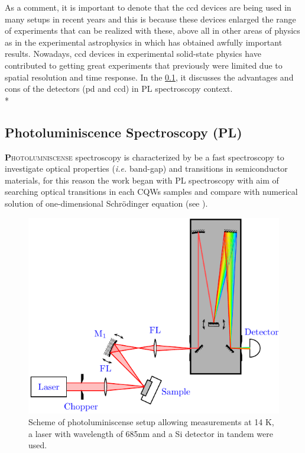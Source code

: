 As a comment, it is important to denote that the \gls{ccd} devices are being used in many setups in recent years and this is because these devices enlarged the range of experiments that can be realized with these, above all in other areas of physics as in the experimental astrophysics in which has obtained awfully important results.  Nowadays, \gls{ccd} devices in experimental solid-state physics have contributed to getting great experiments that previously were limited due to spatial resolution and time response.  In the \cref{subsec:chapter-3-pl}, it discusses the advantages and cons of the detectors (\gls{pd} and \gls{ccd})  in PL spectroscopy context. \\*

\subsection{Photoluminiscence Spectroscopy (PL)}
\label{subsec:chapter-3-pl}
\vspace{-10mm}
\lettrine[lines=3, lraise=.1, nindent=0mm, slope=0mm]{\textbf{P}}{hotolumniscense} spectroscopy is characterized by be a fast spectroscopy to investigate optical properties (\textit{i.e.} band-gap) and transitions in  semiconductor materials, for this reason the work began with PL spectroscopy with aim of searching optical transitions in each CQWs samples and compare with  numerical solution of one-dimensional Schr\"{o}dinger equation (see ). 
\begin{figure}[hbtp!]
	\centering
	\includegraphics[width=\textwidth]{../figures/chapter-3/pl-setup/build-ruco/pl-setup}
	\caption[PL Scheme]{Scheme of photoluminiscense setup allowing measurements at 14 K, a laser with wavelength of 685nm and a Si detector in tandem were used.}
	\label{fig:chapter-3 subsec 3.2.1 PL setup}
\end{figure}

